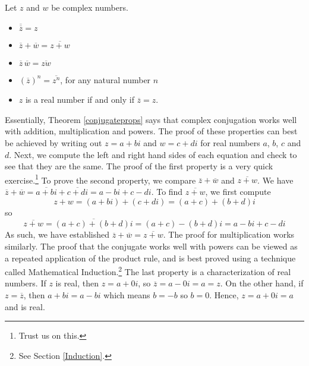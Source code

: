 \smallskip
\colorbox{ResultColor}{\bbm

\begin{thm}  \label{conjugateprops} Let $z$ and $w$ be complex numbers. 

\begin{itemize}

\item  $\overline{\overline{z}} = z$

\item  $ \overline{z} + \overline{w}  = \overline{z+w}$

\item  $ \overline{z} \, \overline{w}  = \overline{zw}$

\item  $\left(\overline{z}\right)^n = \overline{z^{n}}$, for any natural number $n$

\item  $z$ is a real number if and only if $\overline{z} = z$.

\end{itemize}

\end{thm}
\ebm}
\smallskip

Essentially, Theorem \ref{conjugateprops} says that complex conjugation works well with addition, multiplication and powers.  The proof of these properties can best be achieved by writing out $z = a+bi$ and $w = c+di$ for real numbers $a$, $b$, $c$ and $d$.   Next, we compute the left and right hand sides of each equation and check to see that they are the same.  The proof of the first property is a very quick exercise.\footnote{Trust us on this.}  To prove the second property, we compare  $\overline{z} + \overline{w}$ and $\overline{z+w}$.  We have $\overline{z} + \overline{w} = \overline{a+bi} + \overline{c+di}  = a-bi + c-di$.  To find $\overline{z+w}$, we first compute \[z+w = (a+bi) + (c+di) = (a+c)+(b+d)i\] so \[\overline{z+w} = \overline{(a+c)+(b+d)i} = (a+c) - (b+d)i = a - bi + c - di\]  As such, we have established  $\overline{z}+\overline{w} = \overline{z+w}$. The proof for multiplication works similarly.  The proof that the conjugate works well with powers can be viewed as a repeated application of the product rule, and is best proved using a technique called Mathematical Induction.\footnote{See Section \ref{Induction}.}  The last property is a characterization of real numbers.  If $z$ is real, then $z = a + 0i$, so $\overline{z} = a - 0i = a = z$.  On the other hand, if $z=\overline{z}$, then $a+bi = a - bi$ which means $b=-b$ so $b=0$.  Hence, $z = a +0i = a$ and is real.

